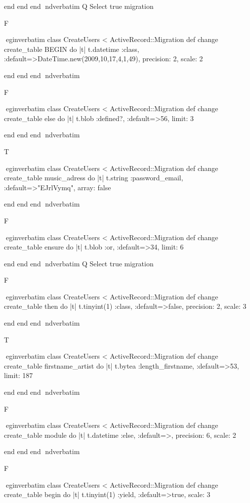     end 
  end 
end
nd{verbatim}
Q
 Select true migration

F

egin{verbatim}
 class CreateUsers < ActiveRecord::Migration 
  def change 
    create_table BEGIN do |t| 
      t.datetime :class, :default=>DateTime.new(2009,10,17,4,1,49), precision: 2, scale: 2
    
    end 
  end 
end
nd{verbatim}

F

egin{verbatim}
 class CreateUsers < ActiveRecord::Migration 
  def change 
    create_table else do |t| 
      t.blob :defined?, :default=>56, limit: 3
    
    end 
  end 
end
nd{verbatim}

T

egin{verbatim}
 class CreateUsers < ActiveRecord::Migration 
  def change 
    create_table music_adress do |t| 
      t.string :password_email, :default=>"EJrlVymq", array: false
    
    end 
  end 
end
nd{verbatim}

F

egin{verbatim}
 class CreateUsers < ActiveRecord::Migration 
  def change 
    create_table ensure do |t| 
      t.blob :or, :default=>34, limit: 6
    
    end 
  end 
end
nd{verbatim}
Q
 Select true migration

F

egin{verbatim}
 class CreateUsers < ActiveRecord::Migration 
  def change 
    create_table then do |t| 
      t.tinyint(1) :class, :default=>false, precision: 2, scale: 3
    
    end 
  end 
end
nd{verbatim}

T

egin{verbatim}
 class CreateUsers < ActiveRecord::Migration 
  def change 
    create_table firstname_artist do |t| 
      t.bytea :length_firstname, :default=>53, limit: 187
    
    end 
  end 
end
nd{verbatim}

F

egin{verbatim}
 class CreateUsers < ActiveRecord::Migration 
  def change 
    create_table module do |t| 
      t.datetime :else, :default=>, precision: 6, scale: 2
    
    end 
  end 
end
nd{verbatim}

F

egin{verbatim}
 class CreateUsers < ActiveRecord::Migration 
  def change 
    create_table begin do |t| 
      t.tinyint(1) :yield, :default=>true, scale: 3
    
